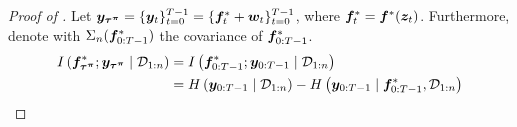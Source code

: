 \begin{proof}[Proof of ]
Let ${\bm{y}}_{{\bm{\tau}}^{{\bm{\pi}}}} = \{{\bm{y}}_t\}^{T-1}_{t=0} = \{{\bm{f}}^*_t + {\bm{w}}_{t}\}^{T-1}_{t=0}$, where ${\bm{f}}^*_t = {\bm{f}}^*({\bm{z}}_{t})$. Furthermore, denote with $\Sigma_{n}({\bm{f}}^*_{0:T-1})$ the covariance of ${\bm{f}}^*_{0:T-1}$.
    \begin{align*}
         I\left(\vf^*_{\vtau^{\vpi}}; \vy_{\vtau^{\vpi}} \mid \setD_{1:n}\right)
         &= I\left(\vf^*_{0:T-1}; \vy_{0:T-1} \mid \setD_{1:n}\right) \\
    &=H\left(\vy_{0:T-1} \mid \setD_{1:n}\right) - H\left(\vy_{0:T-1}\mid  \vf^*_{0:T-1}, \setD_{1:n}\right) \\

\end{align*}
\end{proof}
